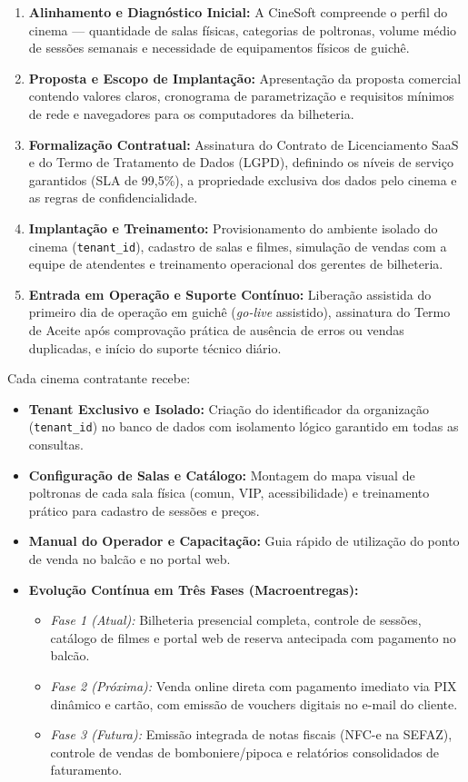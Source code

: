 \begin{enumerate}
\item \textbf{Alinhamento e Diagnóstico Inicial:} A CineSoft compreende o perfil do cinema — quantidade de salas físicas, categorias de poltronas, volume médio de sessões semanais e necessidade de equipamentos físicos de guichê.
\item \textbf{Proposta e Escopo de Implantação:} Apresentação da proposta comercial contendo valores claros, cronograma de parametrização e requisitos mínimos de rede e navegadores para os computadores da bilheteria.
\item \textbf{Formalização Contratual:} Assinatura do Contrato de Licenciamento SaaS e do Termo de Tratamento de Dados (LGPD), definindo os níveis de serviço garantidos (SLA de 99,5\%), a propriedade exclusiva dos dados pelo cinema e as regras de confidencialidade.
\item \textbf{Implantação e Treinamento:} Provisionamento do ambiente isolado do cinema (\texttt{tenant\_id}), cadastro de salas e filmes, simulação de vendas com a equipe de atendentes e treinamento operacional dos gerentes de bilheteria.
\item \textbf{Entrada em Operação e Suporte Contínuo:} Liberação assistida do primeiro dia de operação em guichê (\emph{go-live} assistido), assinatura do Termo de Aceite após comprovação prática de ausência de erros ou vendas duplicadas, e início do suporte técnico diário.
\end{enumerate}


Cada cinema contratante recebe:

\begin{itemize}
\item \textbf{Tenant Exclusivo e Isolado:} Criação do identificador da organização (\texttt{tenant\_id}) no banco de dados com isolamento lógico garantido em todas as consultas.
\item \textbf{Configuração de Salas e Catálogo:} Montagem do mapa visual de poltronas de cada sala física (comun, VIP, acessibilidade) e treinamento prático para cadastro de sessões e preços.
\item \textbf{Manual do Operador e Capacitação:} Guia rápido de utilização do ponto de venda no balcão e no portal web.
\item \textbf{Evolução Contínua em Três Fases (Macroentregas):}
\begin{itemize}
\item \emph{Fase 1 (Atual):} Bilheteria presencial completa, controle de sessões, catálogo de filmes e portal web de reserva antecipada com pagamento no balcão.
\item \emph{Fase 2 (Próxima):} Venda online direta com pagamento imediato via PIX dinâmico e cartão, com emissão de vouchers digitais no e-mail do cliente.
\item \emph{Fase 3 (Futura):} Emissão integrada de notas fiscais (NFC-e na SEFAZ), controle de vendas de bomboniere/pipoca e relatórios consolidados de faturamento.
\end{itemize}
\end{itemize}

